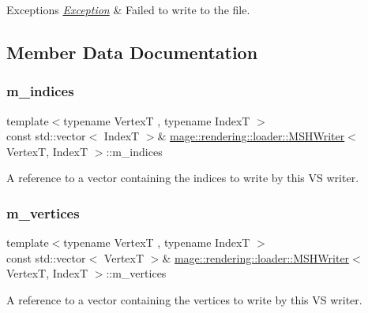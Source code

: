\begin{DoxyExceptions}{Exceptions}
{\em \mbox{\hyperlink{classmage_1_1_exception}{Exception}}} & Failed to write to the file. \\
\hline
\end{DoxyExceptions}


\subsection{Member Data Documentation}
\mbox{\label{classmage_1_1rendering_1_1loader_1_1_m_s_h_writer_a7de7ca864e3a3a384bf7c98997146748}} 
\subsubsection{\texorpdfstring{m\+\_\+indices}{m\_indices}}
{\footnotesize\ttfamily template$<$typename VertexT , typename IndexT $>$ \\
const std\+::vector$<$ IndexT $>$\& \mbox{\hyperlink{classmage_1_1rendering_1_1loader_1_1_m_s_h_writer}{mage\+::rendering\+::loader\+::\+M\+S\+H\+Writer}}$<$ VertexT, IndexT $>$\+::m\+\_\+indices\hspace{0.3cm}{\ttfamily [private]}}

A reference to a vector containing the indices to write by this VS writer. \mbox{\label{classmage_1_1rendering_1_1loader_1_1_m_s_h_writer_adf2b47491fdda0077ba3bf1053f343d0}} 
\subsubsection{\texorpdfstring{m\+\_\+vertices}{m\_vertices}}
{\footnotesize\ttfamily template$<$typename VertexT , typename IndexT $>$ \\
const std\+::vector$<$ VertexT $>$\& \mbox{\hyperlink{classmage_1_1rendering_1_1loader_1_1_m_s_h_writer}{mage\+::rendering\+::loader\+::\+M\+S\+H\+Writer}}$<$ VertexT, IndexT $>$\+::m\+\_\+vertices\hspace{0.3cm}{\ttfamily [private]}}

A reference to a vector containing the vertices to write by this VS writer. 